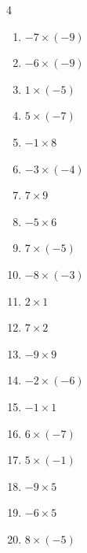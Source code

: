 \begin{multicols}{4}
\begin{enumerate}
  \item $-7\times (-9)$
        \phantom{$=63$}

  \item $-6\times (-9)$
        \phantom{$=54$}

  \item $1\times (-5)$
        \phantom{$=-5$}

  \item $5\times (-7)$
        \phantom{$=-35$}

  \item $-1\times 8$
        \phantom{$=-8$}

  \item $-3\times (-4)$
        \phantom{$=12$}

  \item $7\times 9$
        \phantom{$=63$}

  \item $-5\times 6$
        \phantom{$=-30$}

  \item $7\times (-5)$
        \phantom{$=-35$}

\columnbreak %

  \item $-8\times (-3)$
        \phantom{$=24$}

  \item $2\times 1$
        \phantom{$=2$}

  \item $7\times 2$
        \phantom{$=14$}

  \item $-9\times 9$
        \phantom{$=-81$}

  \item $-2\times (-6)$
        \phantom{$=12$}

  \item $-1\times 1$
        \phantom{$=-1$}

  \item $6\times (-7)$
        \phantom{$=-42$}

  \item $5\times (-1)$
        \phantom{$=-5$}

  \item $-9\times 5$
        \phantom{$=-45$}

  \item $-6\times 5$
        \phantom{$=-30$}

  \item $8\times (-5)$
        \phantom{$=-40$}


\end{enumerate}
\end{multicols}

